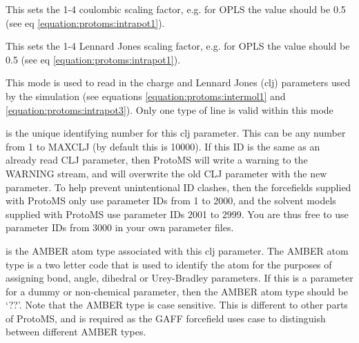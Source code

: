 \documentclass[letterpaper,10pt,english]{sphinxmanual}
\begin{document}
This sets the 1-4 coulombic scaling factor, e.g. for OPLS the value should be 0.5 (see eq \eqref{equation:protoms:intrapot1}).

%
\begin{sphinxVerbatim}[commandchars=\\\{\}]
 
\end{sphinxVerbatim}

This sets the 1-4 Lennard Jones scaling factor, e.g. for OPLS the value should be 0.5 (see eq \eqref{equation:protoms:intrapot1}).

\ignorespaces 
{}

This mode is used to read in the charge and Lennard Jones (clj) parameters used by the simulation (see equations \eqref{equation:protoms:intermol1} and \eqref{equation:protoms:intrapot3}). Only one type of line is valid within this mode

%
\begin{sphinxVerbatim}[commandchars=\\\{\}]
      
\end{sphinxVerbatim}

 is the unique identifying number for this clj parameter. This can be any number from 1 to MAXCLJ (by default this is 10000). If this ID is the same as an already read CLJ parameter, then ProtoMS will write a warning to the WARNING stream, and will overwrite the old CLJ parameter with the new parameter. To help prevent unintentional ID clashes, then the forcefields supplied with ProtoMS only use parameter IDs from 1 to 2000, and the solvent models supplied with ProtoMS use parameter IDs 2001 to 2999. You are thus free to use parameter IDs from 3000 in your own parameter files.

 is the AMBER atom type associated with this clj parameter. The AMBER atom type is a two letter code that is used to identify the atom for the purposes of assigning bond, angle, dihedral or Urey-Bradley parameters. If this is a parameter for a dummy or non-chemical parameter, then the AMBER atom type should be ‘??’. Note that the AMBER type is case sensitive. This is different to other parts of ProtoMS, and is required as the GAFF forcefield uses case to distinguish between different AMBER types.
\end{document}
